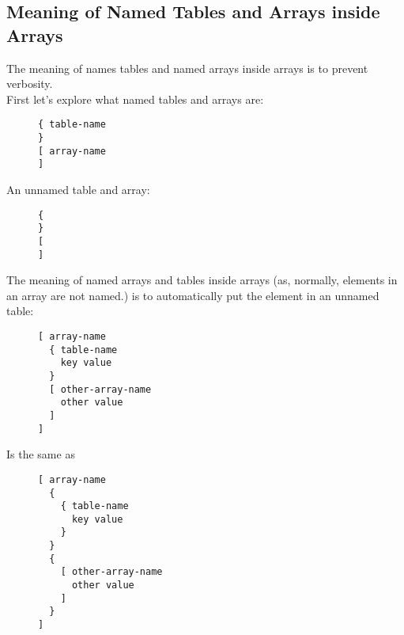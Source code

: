 \documentclass[listof=totoc]{article}
\begin{document}
\subsection{Meaning of Named Tables and Arrays inside Arrays}
\noindent The meaning of names tables and named arrays inside arrays is to prevent verbosity. \\
\noindent First let's explore what named tables and arrays are:

\begin{figure}[H]
\centering
\begin{varwidth}{\linewidth}
\begin{verbatim}
{ table-name
}
[ array-name
]
\end{verbatim}
\end{varwidth}
\caption{}
\end{figure}

An unnamed table and array:

\begin{figure}[H]
\centering
\begin{varwidth}{\linewidth}
\begin{verbatim}
{
}
[
]
\end{verbatim}
\end{varwidth}
\caption{}
\end{figure}

The meaning of named arrays and tables inside arrays (as, normally, elements in an array are not named.) is to automatically put the element in an unnamed table:

\begin{figure}[H]
\centering
\begin{varwidth}{\linewidth}
\begin{verbatim}
[ array-name
  { table-name
    key value
  }
  [ other-array-name
    other value
  ]
]
\end{verbatim}
\end{varwidth}
\caption{}
\end{figure}

Is the same as

\begin{figure}[H]
\centering
\begin{varwidth}{\linewidth}
\begin{verbatim}
[ array-name
  {
    { table-name
      key value
    }
  }
  {
    [ other-array-name
      other value
    ]
  }
]
\end{verbatim}
\end{varwidth}
\caption{}
\end{figure}
\end{document}
